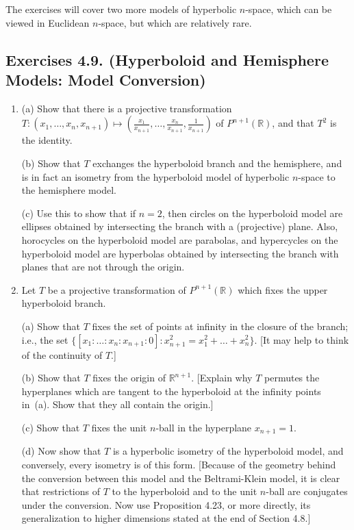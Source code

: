\documentclass[leqno]{book}
\begin{document}
The exercises will cover two more models of hyperbolic $n$-space, which can be viewed in Euclidean $n$-space, but which are relatively rare.

\subsection*{Exercises 4.9. (Hyperboloid and Hemisphere Models: Model Conversion)} %
\begin{enumerate}
\item (a) Show that there is a projective transformation $T:(x_1,\dots,x_n,x_{n+1})\mapsto\left(\frac{x_1}{x_{n+1}},\dots,\frac{x_n}{x_{n+1}},\frac 1{x_{n+1}}\right)$ of $P^{n+1}(\mathbb R)$, and that $T^2$ is the identity.

(b) Show that $T$ exchanges the hyperboloid branch and the hemisphere, and is in fact an isometry from the hyperboloid model of hyperbolic $n$-space to the hemisphere model.

(c) Use this to show that if $n=2$, then circles on the hyperboloid model are ellipses obtained by intersecting the branch with a (projective) plane.  Also, horocycles on the hyperboloid model are parabolas, and hypercycles on the hyperboloid model are hyperbolas obtained by intersecting the branch with planes that are not through the origin.

\item Let $T$ be a projective transformation of $P^{n+1}(\mathbb R)$ which fixes the upper hyperboloid branch.

(a) Show that $T$ fixes the set of points at infinity in the closure of the branch; i.e., the set $\{[x_1:\dots:x_n:x_{n+1}:0]:x_{n+1}^2=x_1^2+\dots+x_n^2\}$.  [It may help to think of the continuity of $T$.]

(b) Show that $T$ fixes the origin of $\mathbb R^{n+1}$.  [Explain why $T$ permutes the hyperplanes which are tangent to the hyperboloid at the infinity points in~(a).  Show that they all contain the origin.]

(c) Show that $T$ fixes the unit $n$-ball in the hyperplane $x_{n+1}=1$.

(d) Now show that $T$ is a hyperbolic isometry of the hyperboloid model, and conversely, every isometry is of this form.  [Because of the geometry behind the conversion between this model and the Beltrami-Klein model, it is clear that restrictions of $T$ to the hyperboloid and to the unit $n$-ball are conjugates under the conversion.  Now use Proposition 4.23, or more directly, its generalization to higher dimensions stated at the end of Section 4.8.]


\end{enumerate}
\end{document}
